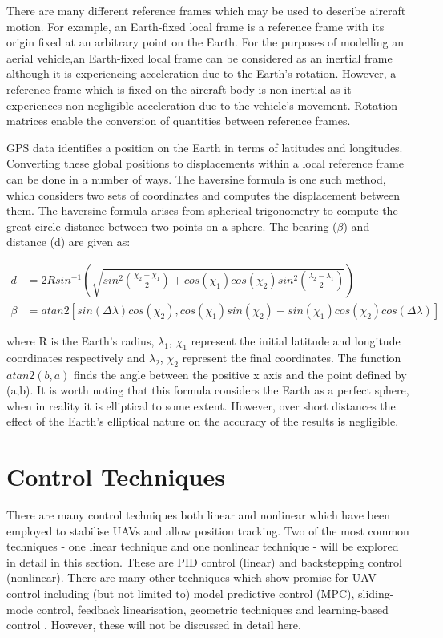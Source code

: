 There are many different reference frames which may be used to describe aircraft motion. For example, an Earth-fixed local frame is a reference frame with its origin fixed at an arbitrary point on the Earth. For the purposes of modelling an aerial vehicle,an Earth-fixed local frame can be considered as an inertial frame although it is experiencing acceleration due to the Earth's rotation. However, a reference frame which is fixed on the aircraft body is non-inertial as it experiences non-negligible acceleration due to the vehicle's movement. Rotation matrices enable the conversion of quantities between reference frames.

GPS data identifies a position on the Earth in terms of latitudes and longitudes. Converting these global positions to displacements within a local reference frame can be done in a number of ways. The haversine formula is one such method, which considers two sets of coordinates and computes the displacement between them. The haversine formula arises from spherical trigonometry to compute the great-circle distance between two points on a sphere. The bearing ($\beta$) and distance (d) are given as:

\begin{equation}\label{eqn:haversine}
\begin{split}
d&=2R sin^{-1} \left( \sqrt{sin^{2}\left( \frac{\chi_{2}-\chi_{1}}{2} \right) +cos(\chi_{1})cos(\chi_{2})sin^{2} \left( \frac{\lambda_{2}-\lambda_{1}}{2}  \right) }\right)\\
\beta&=atan2\left[ sin(\Delta\lambda)cos(\chi_{2}) , cos(\chi_{1})sin(\chi_{2}) - sin(\chi_{1}) cos(\chi_2) cos(\Delta\lambda)\right]
\end{split}
\end{equation}

where R is the Earth's radius, $\lambda_{1}$, $\chi_{1}$ represent the initial latitude and longitude coordinates respectively and $\lambda_{2}$, $\chi_{2}$ represent the final coordinates. The function $atan2(b,a)$ finds the angle between the positive x axis and the point defined by (a,b).
It is worth noting that this formula considers the Earth as a perfect sphere, when in reality it is elliptical to some extent. However, over short distances the effect of the Earth's elliptical nature on the accuracy of the results is negligible.


\section{Control Techniques}
There are many control techniques both linear and nonlinear which have been employed to stabilise UAVs and allow position tracking. Two of the most common techniques - one linear technique and one nonlinear technique - will be explored in detail in this section. These are PID control (linear) and backstepping control (nonlinear). There are many other techniques which show promise for UAV control including (but not limited to) model predictive control (MPC), sliding-mode control, feedback linearisation, geometric techniques and learning-based control \cite{Rubi2019}. However, these will not be discussed in detail here.  
